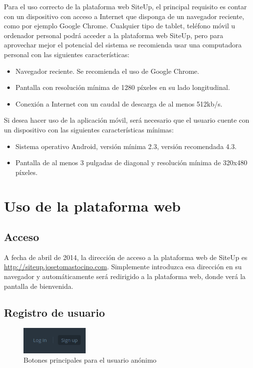 Para el uso correcto de la plataforma web SiteUp, el principal requisito es
contar con un dispositivo con acceso a Internet que disponga de un navegador
reciente, como por ejemplo Google Chrome. Cualquier tipo de tablet, teléfono
móvil u ordenador personal podrá acceder a la plataforma web SiteUp, pero para
aprovechar mejor el potencial del sistema se recomienda usar una computadora
personal con las siguientes características:

\begin{itemize}
\item Navegador reciente. Se recomienda el uso de Google Chrome.
\item Pantalla con resolución mínima de 1280 píxeles en su lado longitudinal.
\item Conexión a Internet con un caudal de descarga de al menos 512kb/s.
\end{itemize}

Si desea hacer uso de la aplicación móvil, será necesario que el usuario cuente
con un dispositivo con las siguientes características mínimas:

\begin{itemize}
\item Sistema operativo Android, versión mínima 2.3, versión recomendada 4.3.
\item Pantalla de al menos 3 pulgadas de diagonal y resolución mínima de 320x480
  píxeles.
\end{itemize}

\section{Uso de la plataforma web}

\subsection{Acceso}

A fecha de abril de 2014, la dirección de acceso a la plataforma web de SiteUp
es \url{http://siteup.josetomastocino.com}. Simplemente introduzca esa dirección
en su navegador y automáticamente será redirigido a la plataforma web, donde
verá la pantalla de bienvenida.

\subsection{Registro de usuario}

\begin{figure}[hbtp]
  \centering
  \includegraphics[width=0.3\textwidth]{apendice_manual_usuario/general_botones.png}
  \caption{Botones principales para el usuario anónimo}
  \label{fig:botones-1}
\end{figure}

